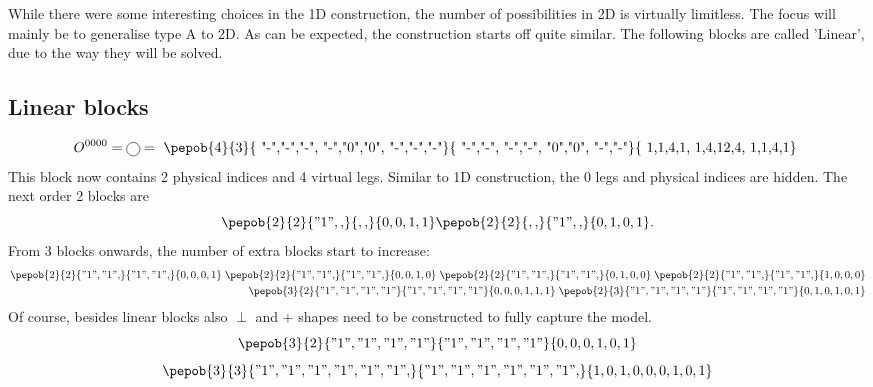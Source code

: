 While there were some interesting choices in the 1D construction, the number of possibilities in 2D is virtually limitless. The focus will mainly be to generalise type A to 2D. As can be expected, the construction starts off quite similar. The following blocks are called 'Linear', due to the way they will be solved.

\subsection{Linear blocks}

\begin{equation}
    O^{0 0 0 0 }= \mpob{1}{ {,}  }{}{}{}{{,,}} = \vcenter{ \hbox{ \pepob{4}{3}{{
                        "-","-","-",
                        "-","0","0",
                        "-","-","-"}}{{
                        "-","-",
                        "-","-",
                        "0","0",
                        "-","-"}}{{
                        1,1,4,1,
                        1,4,12,4,
                        1,1,4,1}} }}
\end{equation}
This block now contains 2 physical indices and 4 virtual legs. Similar to 1D construction, the 0 legs and physical indices are hidden. The next order 2 blocks are
\begin{equation}\label{2dblocksorder2}
    \pepob{2}{2}{{"1",,}}{{,,}}{{0,0,1,1}}  \pepob{2}{2}{{,,}}{{"1",,}}{{0,1,0,1}}.
\end{equation}
From 3 blocks onwards, the number of extra blocks start to increase:
\begin{equation}
    \begin{split}
        \pepob{2}{2}{{"1","1",}}{{"1","1",}}{{0,0,0,1}} \;  \pepob{2}{2}{{"1","1",}}{{"1","1",}}{{0,0,1,0}} \; \pepob{2}{2}{{"1","1",}}{{"1","1",}}{{0,1,0,0}} \; \pepob{2}{2}{{"1","1",}}{{"1","1",}}{{1,0,0,0}}\\
        \pepob{3}{2}{{"1","1","1","1"}}{{"1","1","1","1"}}{{0,0,0,1,1,1}} \; \pepob{2}{3}{{"1","1","1","1"}}{{"1","1","1","1"}}{{0,1,0,1,0,1}}
    \end{split}
\end{equation}
Of course, besides linear blocks also $\perp$ and + shapes need to be constructed to fully capture the model.
\begin{equation}
    \pepob{3}{2}{{"1","1","1","1"}}{{"1","1","1","1"}}{{0,0,0,1,0,1}}
\end{equation}
\begin{equation}
    \pepob{3}{3}{{"1","1","1","1","1","1",}}{{"1","1","1","1","1","1",}}{{1,0,1,0,0,0,1,0,1}}
\end{equation}

